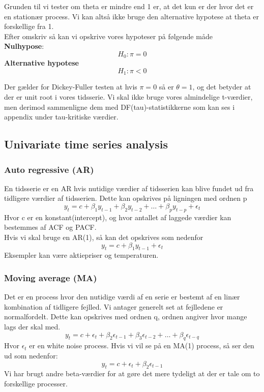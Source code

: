 \documentclass[
  10pt,
]{article}
\begin{document}
Grunden til vi tester om theta er mindre end 1 er, at det kun er der
hvor det er en stationær process. Vi kan altså ikke bruge den
alternative hypotese at theta er forskellige fra 1.\\
Efter omskriv så kan vi opskrive vores hypoteser på følgende måde\\
\textbf{Nulhypose}: \[H_0: \pi = 0 \tag{Unit root}\]
\textbf{Alternative hypotese} \[H_1: \pi < 0 \tag{No unit root}\]

Der gælder for Dickey-Fuller testen at hvis \(\pi = 0\) så er
\(\theta = 1\), og det betyder at der er unit root i vores tidsserie. Vi
skal ikke bruge vores almindelige t-værdier, men derimod sammenligne dem
med DF(tau)-statistikkerne som kan ses i appendix under tau-kritiske
værdier.

\newpage

\hypertarget{univariate-time-series-analysis}{%
\subsection{Univariate time series
analysis}\label{univariate-time-series-analysis}}

\hypertarget{auto-regressive-ar}{%
\subsubsection{Auto regressive (AR)}\label{auto-regressive-ar}}

En tidsserie er en AR hvis nutidige værdier af tidsserien kan blive
fundet ud fra tidligere værdier af tidsserien. Dette kan opskrives på
ligningen med ordnen p
\[y_t = c + \beta_1y_{t-1} + \beta_2y_{t-2} + \ldots + \beta_py_{t-p}+ \epsilon_t\]
Hvor c er en konstant(intercept), og hvor antallet af laggede værdier
kan bestemmes af ACF og PACF.\\
Hvis vi skal bruge en AR(1), så kan det opskrives som nedenfor
\[y_t = c + \beta_1y_{t-1} + \epsilon_t\] Eksempler kan være aktiepriser
og temperaturen.\\

\hypertarget{moving-average-ma}{%
\subsubsection{Moving average (MA)}\label{moving-average-ma}}

Det er en process hvor den nutidige værdi af en serie er bestemt af en
linær kombination af tidligere fejlled. Vi antager generelt set at
fejlledene er normalfordelt. Dette kan opskrives med ordnen q, ordnen
angiver hvor mange lags der skal med.
\[y_t = c + \epsilon_t + \beta_2\epsilon_{t-1} + \beta_3\epsilon_{t-2}+ \ldots + \beta_q\epsilon_{t-q}\]
Hvor \(\epsilon_t\) er en white noise process. Hvis vi vil se på en
MA(1) process, så ser den ud som nedenfor:
\[y_t = c + \epsilon_t + \beta_2\epsilon_{t-1}\] Vi har brugt andre
beta-værdier for at gøre det mere tydeligt at der er tale om to
forskellige processer.\\
\end{document}

